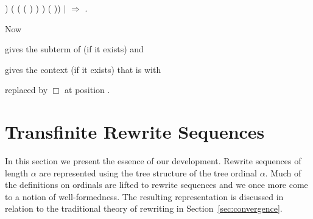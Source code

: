 \begin{singlespace}
\begin{coqdoccode}
)\coqdoceol
\coqdocindent{14.00em}
(
(
 (
) )
)\coqdoceol
\coqdocindent{14.00em}
\coqdoceol
\coqdocindent{14.00em}
( 
))\coqdoceol
\coqdocindent{7.00em}
\coqdoceol
\coqdocindent{5.00em}
\ensuremath{|}
\coqdocvar{\_} \ensuremath{\Rightarrow}
\coqdoceol
\coqdocindent{5.00em}
\coqdoceol
\coqdocindent{3.00em}
\coqdoceol
\coqdocindent{1.00em}
.\coqdoceol
\end{coqdoccode}
\end{singlespace}
Now \begin{coqdoccode}
   \end{coqdoccode} gives the
subterm of  (if it exists)
and \begin{coqdoccode}
   \end{coqdoccode} gives the
context  (if it exists) that is 
with \begin{coqdoccode}
   \end{coqdoccode} replaced by
$\Box$ at position .


\section{Transfinite Rewrite Sequences}\label{sec:seq}

In this section we present the essence of our development. Rewrite
sequences of length $\alpha$ are represented using the tree structure
of the tree ordinal $\alpha$. Much of the definitions on ordinals
are lifted to rewrite sequences and we once more come to a notion of
well-formedness. The resulting representation is discussed in relation
to the traditional theory of rewriting in
Section~\ref{sec:convergence}.

